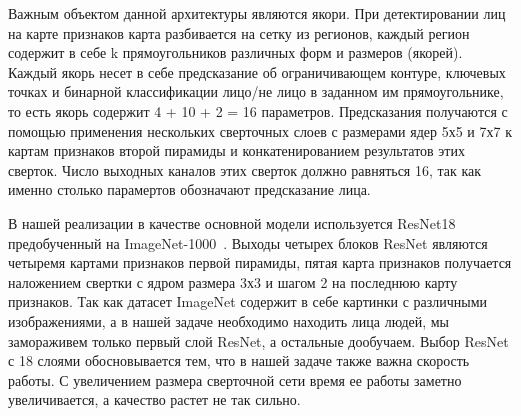 Важным объектом данной архитектуры являются якори.
При детектировании лиц на карте признаков карта разбивается на сетку из регионов, каждый регион содержит в себе k прямоугольников различных форм и размеров (якорей).
Каждый якорь несет в себе предсказание об ограничивающем контуре, ключевых точках и бинарной классификации лицо/не лицо в заданном им прямоугольнике, то есть якорь содержит 4 + 10 + 2 = 16 параметров.
Предсказания получаются с помощью применения нескольких сверточных слоев с размерами ядер 5х5 и 7х7 к картам признаков второй пирамиды и конкатенированием результатов этих сверток.
Число выходных каналов этих сверток должно равняться 16, так как именно столько парамертов обозначают предсказание лица.
\\
\par В нашей реализации в качестве основной модели используется ResNet18 предобученный на ImageNet-1000~\cite{imagenet}.
Выходы четырех блоков ResNet являются четыремя картами признаков первой пирамиды,
пятая карта признаков получается наложением свертки с ядром размера 3х3 и шагом 2 на последнюю карту признаков.
Так как датасет ImageNet содержит в себе картинки с различными изображениями,
а в нашей задаче необходимо находить лица людей, мы замораживем только первый слой ResNet, а остальные дообучаем.
Выбор ResNet с 18 слоями обосновывается тем, что в нашей задаче также важна скорость работы.
С увеличением размера сверточной сети время ее работы заметно увеличивается, а качество растет не так сильно.

